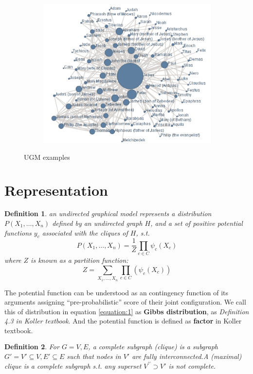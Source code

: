 \documentclass[twoside]{article}
\newtheorem{Defn}{Definition}[section]
\begin{document}
\begin{figure}[!ht]
\begin{subfigure}{.3\textwidth}
	\centering
    \includegraphics[width=.9\linewidth]{assets/ugm_ex3.png}
    \caption{}
\end{subfigure}
\caption{UGM examples}
\label{fig:ugm_ex}
\end{figure}

\section{Representation}
\begin{Defn}
an undirected graphical model represents a distribution \(P(X_1,\ldots,X_n)\) defined by an undirected graph \(H\), and a set of positive potential functions \(y_c\) associated with the cliques of \(H\), s.t.
\begin{equation}
	P(X_1,\ldots,X_n) = \frac{1}{Z} \prod_{c\in C}{\psi_c(X_c)}
    \label{equation:1}
\end{equation}
where \(Z\) is known as a partition function:
\begin{equation}
	Z = \sum_{X_1, \ldots, X_n} \prod_{c\in C}(\psi_c(X_c))
\end{equation}
\end{Defn}
The potential function can be understood as an contingency function of its arguments assigning ``pre-probabilistic'' score of their joint configuration. We call this of distribution in equation \ref{equation:1} as \textbf{Gibbs distribution}, as \emph{Definition 4.3 in Koller textbook}. And the potential function is defined as \textbf{factor} in Koller textbook.

\begin{Defn}
For \(G={V, E}\), a complete subgraph (clique) is a subgraph \(G'={V'\subseteq {V},E'\subseteq{E}}\) such that nodes in \(V'\) are fully interconnected.A (maximal) clique is a complete subgraph s.t. any superset \(V^{\prime\prime} \supset V'\) is not complete.
\end{Defn}
\end{document}
